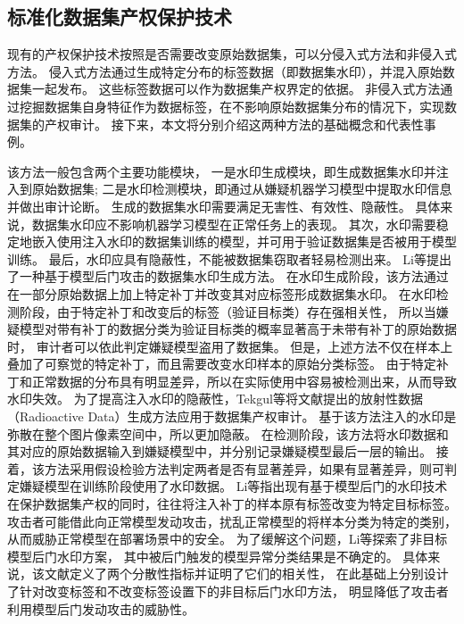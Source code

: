 \subsection{标准化数据集产权保护技术}
现有的产权保护技术按照是否需要改变原始数据集，可以分侵入式方法和非侵入式方法。
侵入式方法通过生成特定分布的标签数据（即数据集水印），并混入原始数据集一起发布。
这些标签数据可以作为数据集产权界定的依据。
非侵入式方法通过挖掘数据集自身特征作为数据标签，在不影响原始数据集分布的情况下，实现数据集的产权审计。
接下来，本文将分别介绍这两种方法的基础概念和代表性事例。

该方法一般包含两个主要功能模块，
一是水印生成模块，即生成数据集水印并注入到原始数据集;
二是水印检测模块，即通过从嫌疑机器学习模型中提取水印信息并做出审计论断。
生成的数据集水印需要满足无害性、有效性、隐蔽性。
具体来说，数据集水印应不影响机器学习模型在正常任务上的表现。
其次，水印需要稳定地嵌入使用注入水印的数据集训练的模型，并可用于验证数据集是否被用于模型训练。
最后，水印应具有隐蔽性，不能被数据集窃取者轻易检测出来。
Li等\cite{DBLP:journals/corr/abs-2010-05821}提出了一种基于模型后门攻击\cite{DBLP:journals/corr/abs-1712-05526, DBLP:journals/access/GuLDG19}的数据集水印生成方法。
在水印生成阶段，该方法通过在一部分原始数据上加上特定补丁并改变其对应标签形成数据集水印。
在水印检测阶段，由于特定补丁和改变后的标签（验证目标类）存在强相关性，
所以当嫌疑模型对带有补丁的数据分类为验证目标类的概率显著高于未带有补丁的原始数据时，
审计者可以依此判定嫌疑模型盗用了数据集。
但是，上述方法不仅在样本上叠加了可察觉的特定补丁，而且需要改变水印样本的原始分类标签。
由于特定补丁和正常数据的分布具有明显差异，所以在实际使用中容易被检测出来，从而导致水印失效\cite{DBLP:journals/compsec/AikenKWR21, DBLP:conf/sp/WangYSLVZZ19}。
为了提高注入水印的隐蔽性，Tekgul等\cite{DBLP:conf/codaspy/TekgulA22}将文献{\rm\parencite{DBLP:conf/icml/SablayrollesDSJ20}}提出的放射性数据（Radioactive Data）生成方法应用于数据集产权审计。
基于该方法注入的水印是弥散在整个图片像素空间中，所以更加隐蔽。
在检测阶段，该方法将水印数据和其对应的原始数据输入到嫌疑模型中，并分别记录嫌疑模型最后一层的输出。
接着，该方法采用假设检验方法判定两者是否有显著差异，如果有显著差异，则可判定嫌疑模型在训练阶段使用了水印数据。
Li等\cite{DBLP:journals/corr/abs-2210-00875}指出现有基于模型后门的水印技术在保护数据集产权的同时，往往将注入补丁的样本原有标签改变为特定目标标签。
攻击者可能借此向正常模型发动攻击，扰乱正常模型的将样本分类为特定的类别，从而威胁正常模型在部署场景中的安全。
为了缓解这个问题，Li等\cite{DBLP:journals/corr/abs-2210-00875}探索了非目标模型后门水印方案，
其中被后门触发的模型异常分类结果是不确定的。
具体来说，该文献定义了两个分散性指标并证明了它们的相关性，
在此基础上分别设计了针对改变标签和不改变标签设置下的非目标后门水印方法，
明显降低了攻击者利用模型后门发动攻击的威胁性。

